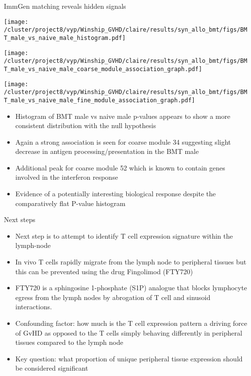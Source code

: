 \documentclass[final,hyperref={pdfpagelabels=false}]{beamer}
\begin{document}
\begin{frame}{}
\begin{columns}[t]
\begin{column}{.36\linewidth}
\begin{block}{ImmGen matching reveals hidden signals}
\begin{minipage}{0.30\textwidth}
        \texttt{[image: /cluster/project8/vyp/Winship\_GVHD/claire/results/syn\_allo\_bmt/figs/BMT\_male\_vs\_naive\_male\_histogram.pdf]}
      \end{minipage}
  \hfill
      \begin{minipage}{0.30\textwidth}
        \texttt{[image: /cluster/project8/vyp/Winship\_GVHD/claire/results/syn\_allo\_bmt/figs/BMT\_male\_vs\_naive\_male\_coarse\_module\_association\_graph.pdf]}
      \end{minipage}
  \hfill
  \begin{minipage}{0.30\textwidth}
        \texttt{[image: /cluster/project8/vyp/Winship\_GVHD/claire/results/syn\_allo\_bmt/figs/BMT\_male\_vs\_naive\_male\_fine\_module\_association\_graph.pdf]}
      \end{minipage}
  \hfill
{\small \begin{itemize}
\item Histogram of BMT male vs naive male p-values appears to show a more consistent distribution with the null hypothesis
\item Again a strong association is seen for coarse module 34 suggesting slight decrease in antigen processing/presentation in the BMT male
\item Additional peak for coarse module 52 which is known to contain genes involved in the interferon response 
\item Evidence of a potentially interesting biological response despite the comparatively flat P-value histogram 
\end{itemize}}
    \end{block}




\begin{block}{Next steps}
{\small  \begin{itemize}
        \item Next step is to attempt to identify T cell expression signature within the lymph-node
    \item In vivo T cells rapidly migrate from the lymph node to peripheral tissues but this can be prevented using the drug Fingolimod (FTY720) 
     \item FTY720 is a sphingosine 1-phosphate (S1P) analogue that blocks lymphocyte egress from the lymph nodes by abrogation of T cell and sinusoid interactions.
      \item Confounding factor: how much is the T cell expression pattern a driving force of GvHD as opposed to the T cells simply behaving differently in peripheral tissues compared to the lymph node
      \item Key question: what proportion of unique peripheral tissue expression should be considered significant 
      \end{itemize}}
\end{block}
\end{column}
\end{columns}
\end{frame}
\end{document}
